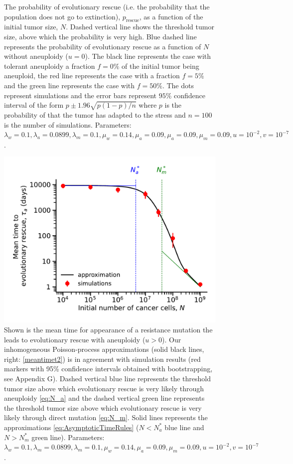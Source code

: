 \documentclass[12pt]{extarticle}
\newcommand{\presc}{p_\text{rescue}}
\begin{document}
\begin{appendices}
\begin{figure}
\caption{The probability of evolutionary rescue (i.e. the probability that the population does not go to extinction), $\presc$, as a function of the initial tumor size, $N$. Dashed vertical line shows the threshold tumor size, above which the probability is very high. Blue dashed line represents the probability of evolutionary rescue as a function of $N$ without aneuploidy ($u=0$). The black line represents the case with tolerant aneuploidy a fraction $f=0\%$ of the initial tumor being aneuploid, the red line represents the case with a fraction $f=5\%$ and the green line represents the case with $f=50\%$. The dots represent simulations and the error bars represent $95\%$ confidence interval of the form $p\pm1.96\sqrt{p\left(1-p\right)/n}$ where $p$ is the probability of that the tumor has adapted to the stress and $n=100$ is the number of simulations. Parameters: $\lambda_w=0.1,\lambda_a=0.0899,\lambda_m=0.1,\mu_w=0.14,\mu_a=0.09,\mu_a=0.09,\mu_m=0.09, u=10^{-2}, v=10^{-7}$.}
\label{rescue_prob_sgv}
\end{figure}
\end{appendices}
\begin{figure}
\vspace*{1\baselineskip}
\includegraphics[width=1\textwidth]{Figures/EvolutionaryRescueTimeComplete.pdf}
\caption{Shown is the mean time for appearance of a resistance mutation the leads to evolutionary rescue with aneuploidy ($u>0$). Our inhomogeneous Poisson-process approximations (solid black lines, right: \cref{meantimet2}) is in agreement with simulation results (red markers with 95\% confidence intervals obtained with bootstrapping, see Appendix G). Dashed vertical blue line represents the threshold tumor size above which evolutionary rescue is very likely through aneuploidy \cref{eq:N_a} and the dashed vertical green line represents the threshold tumor size above which evolutionary rescue is very likely through direct mutation \cref{eq:N_m}. Solid lines represents the approximations \cref{eq:AsymptoticTimeRules} ($N<N_a^*$ blue line and $N>N_m^*$ green line). 
Parameters: $\lambda_w=0.1,\lambda_m=0.0899,\lambda_m=0.1,\mu_w=0.14,\mu_a=0.09,\mu_m=0.09, u=10^{-2}, v=10^{-7}$.}
\label{EvolutionaryRescueTimeComplete}
\end{figure}
\end{document}

